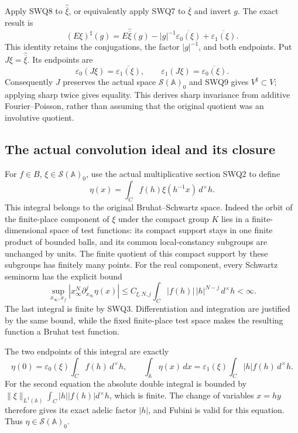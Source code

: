 \documentclass[11pt]{article}
\begin{document}
Apply SWQ8 to $\widehat{\overline\xi}$, or equivalently apply
SWQ7 to $\overline\xi$ and invert $g$. The exact result is
\begin{equation}\tag{SWQ9}
 (E\xi)^{\sharp}(g)
 =E\widehat{\overline\xi}(g)
      -|g|^{-1}\overline{\varepsilon_0(\xi)}
      +\overline{\varepsilon_1(\xi)}.
\end{equation}
This identity retains the conjugations, the factor $|g|^{-1}$,
and both endpoints. Put $J\xi=\widehat{\overline\xi}$. Its
endpoints are
\begin{equation}\tag{SWQ10}
 \varepsilon_0(J\xi)=\overline{\varepsilon_1(\xi)},\qquad
 \varepsilon_1(J\xi)=\overline{\varepsilon_0(\xi)}.
\end{equation}
Consequently $J$ preserves the actual space $\mathcal S(\mathbb A)_0$
and SWQ9 gives $V^{\sharp}\subset V$; applying sharp twice gives
equality. This derives sharp invariance from additive Fourier--Poisson,
rather than assuming that the original quotient was an involutive
quotient.

\subsection{The actual convolution ideal and its closure}

For $f\in B$, $\xi\in\mathcal S(\mathbb A)_0$, use the actual
multiplicative section SWQ2 to define
\begin{equation}\tag{SWQ11}
 \eta(x)=\int_C f(h)\xi(h^{-1}x)\,d^{\times}h.
\end{equation}
This integral belongs to the original Bruhat--Schwartz space.
Indeed the orbit of the finite-place component of $\xi$ under
the compact group $K$ lies in a finite-dimensional space of test
functions: its compact support stays in one finite product of
bounded balls, and its common local-constancy subgroups are unchanged
by units. The finite quotient of this compact support by these
subgroups has finitely many points. For the real component, every
Schwartz seminorm has the explicit bound
\begin{equation}\tag{SWQ12}
 \sup_{x_\infty,x_f}
 |x_\infty^N\partial_{x_\infty}^j\eta(x)|
 \le C_{\xi,N,j}\int_C |f(h)|\,|h|^{N-j}\,d^{\times}h<\infty.
\end{equation}
The last integral is finite by SWQ3. Differentiation and integration
are justified by the same bound, while the fixed finite-place
test space makes the resulting function a Bruhat test function.

The two endpoints of this integral are exactly
\begin{equation}\tag{SWQ13}
 \eta(0)=\varepsilon_0(\xi)\int_C f(h)\,d^{\times}h,\qquad
 \int_{\mathbb A}\eta(x)\,dx
 =\varepsilon_1(\xi)\int_C |h|f(h)\,d^{\times}h.
\end{equation}
For the second equation the absolute double integral is bounded by
$\|\xi\|_{L^1(\mathbb A)}\int_C|h||f(h)|d^{\times}h$, which is
finite. The change of variables $x=hy$ therefore gives its exact
adelic factor $|h|$, and Fubini is valid for this equation.
Thus $\eta\in\mathcal S(\mathbb A)_0$.
\end{document}
